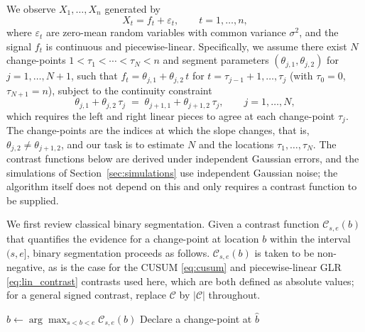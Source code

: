 \documentclass[12pt, a4paper]{article}
\begin{document}
We observe $X_1, \ldots, X_n$ generated by
\begin{equation}
\label{eq:model}
    X_t = f_t + \varepsilon_t, \qquad t = 1, \ldots, n,
\end{equation}
where $\varepsilon_t$ are zero-mean random variables with common variance $\sigma^2$, and the signal $f_t$ is continuous and piecewise-linear. Specifically, we assume there exist $N$ change-points $1 < \tau_1 < \cdots < \tau_N < n$ and segment parameters $(\theta_{j,1}, \theta_{j,2})$ for $j = 1, \ldots, N\!+\!1$, such that $f_t = \theta_{j,1} + \theta_{j,2}\, t$ for $t = \tau_{j-1}+1, \ldots, \tau_j$ (with $\tau_0 = 0$, $\tau_{N+1} = n$), subject to the continuity constraint
\begin{equation}
\label{eq:continuity}
    \theta_{j,1} + \theta_{j,2}\, \tau_j \;=\; \theta_{j+1,1} + \theta_{j+1,2}\, \tau_j, \qquad j = 1, \ldots, N,
\end{equation}
which requires the left and right linear pieces to agree at each change-point $\tau_j$. The change-points are the indices at which the slope changes, that is, $\theta_{j,2} \neq \theta_{j+1,2}$, and our task is to estimate $N$ and the locations $\tau_1, \ldots, \tau_N$. The contrast functions below are derived under independent Gaussian errors, and the simulations of Section~\ref{sec:simulations} use independent Gaussian noise; the algorithm itself does not depend on this and only requires a contrast function to be supplied.

We first review classical binary segmentation. Given a contrast function $\mathcal{C}_{s,e}(b)$ that quantifies the evidence for a change-point at location $b$ within the interval $(s, e]$, binary segmentation proceeds as follows. $\mathcal{C}_{s,e}(b)$ is taken to be non-negative, as is the case for the CUSUM \eqref{eq:cusum} and piecewise-linear GLR \eqref{eq:lin_contrast} contrasts used here, which are both defined as absolute values; for a general signed contrast, replace $\mathcal{C}$ by $|\mathcal{C}|$ throughout.

\begin{algorithm}[H]
\caption{Classical Binary Segmentation}
\label{alg:bs}
\begin{algorithmic}[1]
    \State $\hat{b} \gets \arg\max_{s < b < e} \mathcal{C}_{s,e}(b)$
        \State Declare a change-point at $\hat{b}$
        \State {} \Comment{Recurse on $(s, \hat{b}]$}
        \State {} \Comment{Recurse on $(\hat{b}, e]$}
    \EndIf
\EndFunction
\end{algorithmic}
\end{algorithm}
\end{document}

